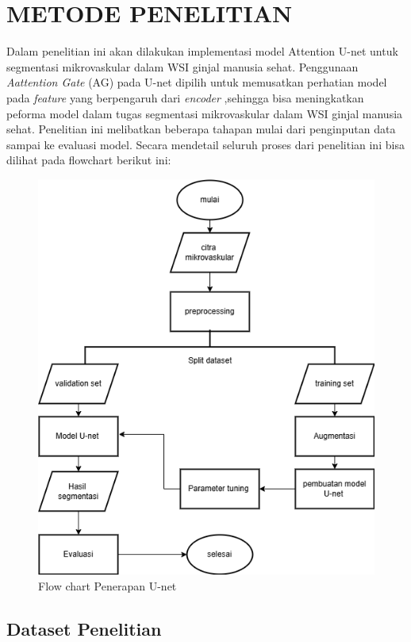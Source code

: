 \chapter{METODE PENELITIAN}

\noindent Dalam penelitian ini akan dilakukan implementasi model Attention U-net untuk segmentasi mikrovaskular dalam WSI ginjal manusia sehat.  Penggunaan \textit{Aattention Gate} (AG) pada U-net dipilih untuk memusatkan perhatian model pada \textit{feature} yang berpengaruh dari \textit{encoder} ,sehingga bisa meningkatkan peforma model dalam tugas segmentasi mikrovaskular dalam WSI ginjal manusia sehat. Penelitian ini melibatkan beberapa tahapan mulai dari penginputan data sampai ke evaluasi model. Secara mendetail seluruh proses dari penelitian ini bisa dilihat pada flowchart berikut ini:
\begin{figure}[H]
	\centering
	\includegraphics[scale=.6]{gambar/flow-chart.png}
	\caption{Flow chart Penerapan U-net}
	\label{fig:flow-chart}
\end{figure}

\section{Dataset Penelitian}

